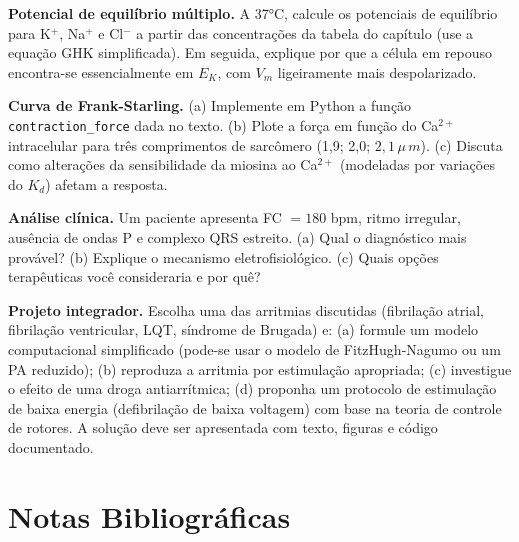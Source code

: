 \begin{exercicio}
\textbf{Potencial de equilíbrio múltiplo.} A 37°C, calcule os potenciais
de equilíbrio para K$^+$, Na$^+$ e Cl$^-$ a partir das concentrações da
tabela do capítulo (use a equação GHK simplificada). Em seguida, explique
por que a célula em repouso encontra-se essencialmente em $E_K$, com
$V_m$ ligeiramente mais despolarizado.
\end{exercicio}

\begin{exercicio}
\textbf{Curva de Frank-Starling.} (a) Implemente em Python a função
\texttt{contraction\_force} dada no texto. (b) Plote a força em função
do Ca$^{2+}$ intracelular para três comprimentos de sarcômero (1,9; 2,0;
$2{,}1\,\mu\,m$). (c) Discuta como alterações da sensibilidade da miosina ao
Ca$^{2+}$ (modeladas por variações do $K_d$) afetam a resposta.
\end{exercicio}

\begin{exercicio}
\textbf{Análise clínica.} Um paciente apresenta FC $= 180$ bpm, ritmo
irregular, ausência de ondas P e complexo QRS estreito. (a) Qual o
diagnóstico mais provável? (b) Explique o mecanismo eletrofisiológico.
(c) Quais opções terapêuticas você consideraria e por quê?
\end{exercicio}

\begin{exercicio}
\textbf{Projeto integrador.} Escolha uma das arritmias discutidas
(fibrilação atrial, fibrilação ventricular, LQT, síndrome de Brugada) e:
(a) formule um modelo computacional simplificado (pode-se usar o modelo
de FitzHugh-Nagumo ou um PA reduzido); (b) reproduza a arritmia por
estimulação apropriada; (c) investigue o efeito de uma droga
antiarrítmica; (d) proponha um protocolo de estimulação de baixa energia
(defibrilação de baixa voltagem) com base na teoria de controle de
rotores. A solução deve ser apresentada com texto, figuras e código
documentado.
\end{exercicio}

\section{Notas Bibliográficas}
\label{sec:12-bibliografia}

